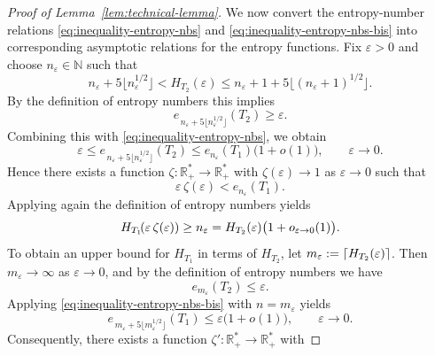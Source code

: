 \documentclass[a4paper,12pt]{article}
\let\originalleft\left
\let\originalright\right
\renewcommand{\left}{\mathopen{}\mathclose\bgroup\originalleft}
\renewcommand{\right}{\aftergroup\egroup\originalright}
\newcommand{\N}{\mathbb{N}}
\newcommand{\R}{\mathbb{R}}
\begin{document}
\begin{proof}[Proof of Lemma~\ref{lem:technical-lemma}]
We now convert the entropy-number relations
\eqref{eq:inequality-entropy-nbs} and \eqref{eq:inequality-entropy-nbs-bis}
into corresponding asymptotic relations for the entropy functions.
Fix $\varepsilon>0$ and choose $n_\varepsilon\in\N$ such that
\begin{equation}\label{eq:definition-k-entropy}
    n_\varepsilon+5\lfloor n_\varepsilon^{1/2}\rfloor
    <
    H_{T_2}(\varepsilon)
    \le
  n_\varepsilon+1+5\lfloor (n_\varepsilon+1)^{1/2}\rfloor.
\end{equation}
By the definition of entropy numbers this implies
\[
e_{\,n_\varepsilon+5\lfloor n_\varepsilon^{1/2}\rfloor}(T_2)\ge \varepsilon .
\]
Combining this with \eqref{eq:inequality-entropy-nbs}, we obtain
\[
\varepsilon
\le
e_{\,n_\varepsilon+5\lfloor n_\varepsilon^{1/2}\rfloor}(T_2)
\le
e_{n_\varepsilon}(T_1)\bigl(1+o(1)\bigr),
\qquad \varepsilon\to0 .
\]
Hence there exists a function $\zeta:\R_+^*\to\R_+^*$ with
$\zeta(\varepsilon)\to1$ as $\varepsilon\to0$ such that
\begin{equation}\label{eq:relation-eps-entropy-nbs}
    \varepsilon\,\zeta(\varepsilon)
    <
    e_{n_\varepsilon}(T_1).
\end{equation}
Applying again the definition of entropy numbers yields
\begin{equation}\label{eq:useful-relation1}
    H_{T_1}\!\left(\varepsilon\,\zeta(\varepsilon)\right)
    \ge
    n_\varepsilon
    =
    H_{T_2}(\varepsilon)\bigl(1+o_{\varepsilon\to0}(1)\bigr).
\end{equation}
To obtain an upper bound for \(H_{T_1}\) in terms of \(H_{T_2}\), let $m_\varepsilon := \left\lceil H_{T_2}(\varepsilon) \right\rceil$.
Then $m_\varepsilon\to\infty$ as $\varepsilon\to0$, and by the definition of
entropy numbers we have
\[
e_{m_\varepsilon}(T_2)\le \varepsilon .
\]
Applying \eqref{eq:inequality-entropy-nbs-bis} with $n=m_\varepsilon$ yields
\[
e_{\,m_\varepsilon+5\lfloor m_\varepsilon^{1/2}\rfloor}(T_1)
\le
\varepsilon\bigl(1+o(1)\bigr),
\qquad \varepsilon\to0 .
\]
Consequently, there exists a function
$\zeta':\mathbb{R}_+^*\to\mathbb{R}_+^*$ with

\end{proof}
\end{document}
